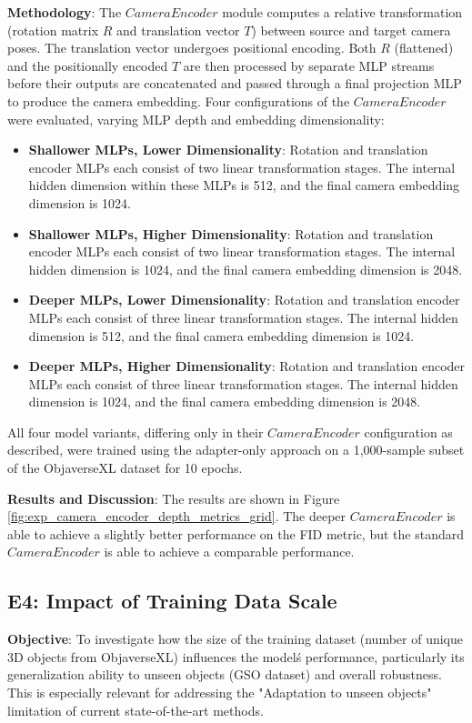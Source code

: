 \textbf{Methodology}:
The $CameraEncoder$ module computes a relative transformation (rotation matrix $R$ and translation vector $T$) between source and target camera poses. The translation vector undergoes positional encoding. Both $R$ (flattened) and the positionally encoded $T$ are then processed by separate MLP streams before their outputs are concatenated and passed through a final projection MLP to produce the camera embedding.
Four configurations of the $CameraEncoder$ were evaluated, varying MLP depth and embedding dimensionality:
\begin{itemize}
  \item \textbf{Shallower MLPs, Lower Dimensionality}: Rotation and translation encoder MLPs each consist of two linear transformation stages. The internal hidden dimension within these MLPs is 512, and the final camera embedding dimension is 1024.
  \item \textbf{Shallower MLPs, Higher Dimensionality}: Rotation and translation encoder MLPs each consist of two linear transformation stages. The internal hidden dimension is 1024, and the final camera embedding dimension is 2048.
  \item \textbf{Deeper MLPs, Lower Dimensionality}: Rotation and translation encoder MLPs each consist of three linear transformation stages. The internal hidden dimension is 512, and the final camera embedding dimension is 1024.
  \item \textbf{Deeper MLPs, Higher Dimensionality}: Rotation and translation encoder MLPs each consist of three linear transformation stages. The internal hidden dimension is 1024, and the final camera embedding dimension is 2048.
\end{itemize}
All four model variants, differing only in their $CameraEncoder$ configuration as described, were trained using the adapter-only approach on a 1,000-sample subset of the ObjaverseXL dataset for 10 epochs.

\textbf{Results and Discussion}:
The results are shown in Figure \ref{fig:exp_camera_encoder_depth_metrics_grid}. The deeper $CameraEncoder$ is able to achieve a slightly better performance on the FID metric, but the standard $CameraEncoder$ is able to achieve a comparable performance.

\subsection{E4: Impact of Training Data Scale}\label{ssec:exp_data_scale}
\textbf{Objective}: To investigate how the size of the training dataset (number of unique 3D objects from ObjaverseXL) influences the model\'s performance, particularly its generalization ability to unseen objects (GSO dataset) and overall robustness. This is especially relevant for addressing the "Adaptation to unseen objects" limitation of current state-of-the-art methods.

